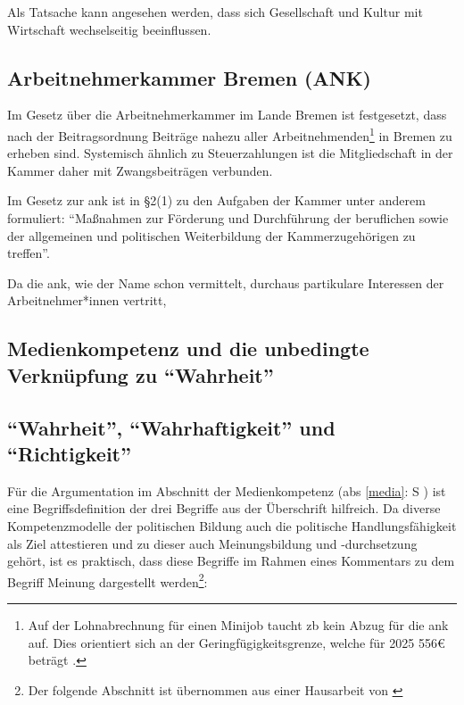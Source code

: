 

Als Tatsache kann angesehen werden, dass sich Gesellschaft und Kultur mit Wirtschaft wechselseitig beeinflussen. 


\subsection{Arbeitnehmerkammer Bremen (ANK) \label{ank}}
Im Gesetz über die Arbeitnehmerkammer im Lande Bremen \autocite[]{ArbnkG} ist festgesetzt, dass nach der Beitragsordnung \autocite[]{ArbnkB} Beiträge nahezu aller Arbeitnehmenden\footnote{ 
    Auf der Lohnabrechnung für einen Minijob taucht \gls{zb} kein Abzug für die \gls{ank} auf. Dies orientiert sich an der Geringfügigkeitsgrenze, welche für 2025 556€ beträgt \autocites{b.gering}{banz.gering}.} 
in Bremen zu erheben sind. Systemisch ähnlich zu Steuerzahlungen ist die Mitgliedschaft in der Kammer daher mit Zwangsbeiträgen verbunden. 

Im Gesetz zur \gls{ank} ist in \S2(1) \autocite[1]{ArbnkG} zu den Aufgaben der Kammer unter anderem formuliert: \enquote{Maßnahmen zur Förderung und Durchführung der beruflichen sowie der allgemeinen und politischen Weiterbildung der Kammerzugehörigen zu treffen}.


Da die \gls{ank}, wie der Name schon vermittelt, durchaus partikulare Interessen der Arbeitnehmer*innen vertritt, 



\subsection{Medienkompetenz und die unbedingte Verknüpfung zu \enquote{Wahrheit} \label{media}} 

\subsection{\enquote{Wahrheit}, \enquote{Wahrhaftigkeit} und \enquote{Richtigkeit} \label{wahr}}

Für die Argumentation im Abschnitt der Medienkompetenz (\gls{abs} \ref{media}: \gls{S} \pageref{media}) ist eine Begriffsdefinition der drei Begriffe aus der Überschrift hilfreich. Da diverse Kompetenzmodelle der politischen Bildung auch die politische Handlungsfähigkeit als Ziel attestieren und zu dieser auch Meinungsbildung und -durchsetzung gehört, ist es praktisch, dass diese Begriffe im Rahmen eines Kommentars zu dem Begriff Meinung dargestellt werden\footnote{Der folgende Abschnitt ist übernommen aus einer Hausarbeit von \textcite[4]{Klein2022}}:

